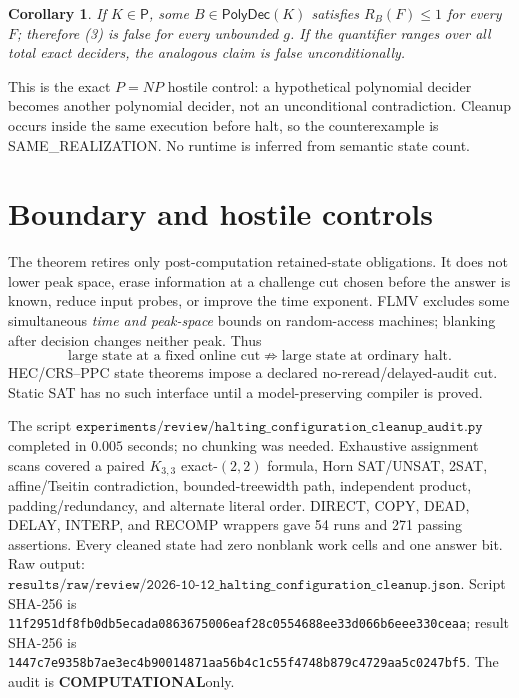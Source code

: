 \documentclass[11pt]{article}
\newtheorem{corollary}[theorem]{Corollary}
\newcommand{\PolyDec}{\mathsf{PolyDec}}
\newcommand{\COMP}{\textbf{COMPUTATIONAL}}
\begin{document}
\begin{corollary}
If \(K\in\mathsf P\), some \(B\in\PolyDec(K)\) satisfies \(R_B(F)\le1\)
for every \(F\); therefore (3) is false for every unbounded \(g\). If the
quantifier ranges over all total exact deciders, the analogous claim is
false unconditionally.
\end{corollary}

This is the exact \(P=NP\) hostile control: a hypothetical polynomial
decider becomes another polynomial decider, not an unconditional
contradiction. Cleanup occurs inside the same execution before halt, so the
counterexample is SAME\_REALIZATION. No runtime is inferred from semantic
state count.

\section{Boundary and hostile controls}
The theorem retires only post-computation retained-state obligations. It
does not lower peak space, erase information at a challenge cut chosen
before the answer is known, reduce input probes, or improve the time
exponent. FLMV excludes some simultaneous \emph{time and peak-space} bounds
on random-access machines; blanking after decision changes neither peak.
Thus
\[
 \text{large state at a fixed online cut}\not\Rightarrow
 \text{large state at ordinary halt}. \tag{5}
\]
HEC/CRS--PPC state theorems impose a declared no-reread/delayed-audit cut.
Static SAT has no such interface until a model-preserving compiler is proved.

The script
\(\texttt{experiments/review/halting\_configuration\_cleanup\_audit.py}\)
completed in \(0.005\) seconds; no chunking was needed. Exhaustive assignment
scans covered a paired \(K_{3,3}\) exact-\((2,2)\) formula, Horn SAT/UNSAT,
2SAT, affine/Tseitin contradiction, bounded-treewidth path, independent
product, padding/redundancy, and alternate literal order. DIRECT, COPY, DEAD,
DELAY, INTERP, and RECOMP wrappers gave 54 runs and 271 passing assertions.
Every cleaned state had zero nonblank work cells and one answer bit.
Raw output:
\(\texttt{results/raw/review/2026-10-12\_halting\_configuration\_cleanup.json}\).
Script SHA-256 is
\texttt{11f2951df8fb0db5ecada0863675006eaf28c0554688ee33d066b6eee330ceaa};
result SHA-256 is
\texttt{1447c7e9358b7ae3ec4b90014871aa56b4c1c55f4748b879c4729aa5c0247bf5}.
The audit is \COMP only.
\end{document}
